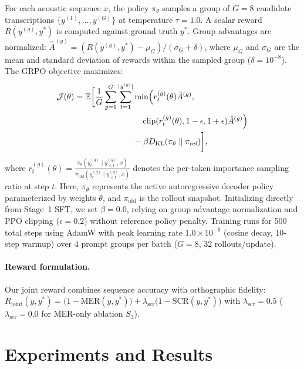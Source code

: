 \documentclass[10pt,twocolumn,a4paper]{article}
\newcommand{\sys}[1]{$S_{#1}$}
\DeclareMathOperator{\clip}{clip}
\begin{document}
For each acoustic sequence $x$, the policy $\pi_\theta$ samples a group of $G = 8$ candidate transcriptions $\{y^{(1)}, \dots, y^{(G)}\}$ at temperature $\tau = 1.0$. A scalar reward $R(y^{(g)}, y^*)$ is computed against ground truth $y^*$. Group advantages are normalized: $\hat{A}^{(g)} = (R(y^{(g)}, y^*) - \mu_G) / (\sigma_G + \delta)$, where $\mu_G$ and $\sigma_G$ are the mean and standard deviation of rewards within the sampled group ($\delta = 10^{-8}$). The GRPO objective maximizes:
\begin{equation}
\label{eq:grpo}
\begin{aligned}
\mathcal{J}(\theta) = \mathbb{E}\biggl[ \frac{1}{G} \sum_{g=1}^{G} \sum_{t=1}^{|y^{(g)}|} 
  &\min \Bigl( r_t^{(g)}(\theta) \hat{A}^{(g)}, \\
  &\quad \clip(r_t^{(g)}(\theta), 1-\epsilon, 1+\epsilon) \hat{A}^{(g)} \Bigr) \\
  &- \beta D_{\text{KL}}(\pi_\theta \parallel \pi_{\text{ref}}) \biggr],
\end{aligned}
\end{equation}
where $r_t^{(g)}(\theta) = \frac{\pi_\theta(y_t^{(g)} \mid y_{<t}^{(g)}, x)}{\pi_{\text{old}}(y_t^{(g)} \mid y_{<t}^{(g)}, x)}$ denotes the per-token importance sampling ratio at step $t$. Here, $\pi_\theta$ represents the active autoregressive decoder policy parameterized by weights $\theta$, and $\pi_{\text{old}}$ is the rollout snapshot. Initializing directly from Stage~1 SFT, we set $\beta = 0.0$, relying on group advantage normalization and PPO clipping ($\epsilon = 0.2$) without reference policy penalty. Training runs for 500 total steps using AdamW with peak learning rate $1.0 \times 10^{-6}$ (cosine decay, 10-step warmup) over 4 prompt groups per batch ($G=8$, 32 rollouts/update).

\paragraph{Reward formulation.}
Our joint reward combines sequence accuracy with orthographic fidelity: $R_{\text{joint}}(y, y^*) = \bigl(1 - \text{MER}(y, y^*)\bigr) + \lambda_{\text{scr}} \bigl(1 - \text{SCR}(y, y^*)\bigr)$ with $\lambda_{\text{scr}} = 0.5$ ($\lambda_{\text{scr}} = 0.0$ for MER-only ablation \sys{3}).

\section{Experiments and Results}
\end{document}
